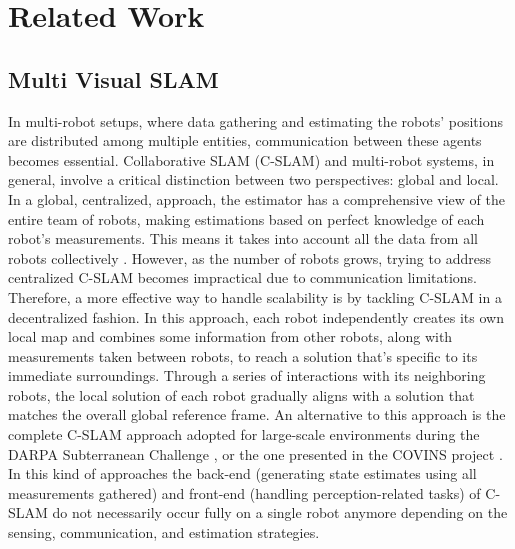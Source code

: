 \section{Related Work}
\label{sec:literature}

    

\begin{comment}
Talk about:
\begin{itemize}
    \item We will use the ROS framework. So we need to choose between the available mapping libraries. RTAB-Map is a good fit for our needs, since it reaches state-of-the-art levels of accuracy. Talk about SLAM, visual odometry, dense point cloud reconstruction, say that they are all top level. Most importantly, it also generates a 2D occupancy-grid, like lidar-based algorithms do. Occupancy grids are the starting point of autonomous exploration and navigation algorithms. And so on.
    

\end{itemize}
\end{comment}


\subsection{Multi Visual SLAM}

In multi-robot setups, where data gathering and estimating the robots' positions are distributed among multiple entities, communication between these agents becomes essential. Collaborative SLAM (C-SLAM) and multi-robot systems, in general, involve a critical distinction between two perspectives: global and local. In a global, centralized, approach, the estimator has a comprehensive view of the entire team of robots, making estimations based on perfect knowledge of each robot's measurements. This means it takes into account all the data from all robots collectively \cite{lajoie2021towards}. However, as the number of robots grows, trying to address centralized C-SLAM becomes impractical due to communication limitations. Therefore, a more effective way to handle scalability is by tackling C-SLAM in a decentralized fashion. In this approach, each robot independently creates its own local map and combines some information from other robots, along with measurements taken between robots, to reach a solution that's specific to its immediate surroundings. Through a series of interactions with its neighboring robots, the local solution of each robot gradually aligns with a solution that matches the overall global reference frame. An alternative to this approach is the complete C-SLAM approach adopted for large-scale environments during the DARPA Subterranean Challenge \cite{denniston2022loop}, or the one presented in the COVINS project \cite{schmuck2021covins}. In this kind of approaches the back-end (generating state estimates using all measurements gathered) and front-end (handling perception-related tasks) of C-SLAM do not necessarily occur fully on a single robot anymore depending on the sensing, communication, and estimation strategies. 

